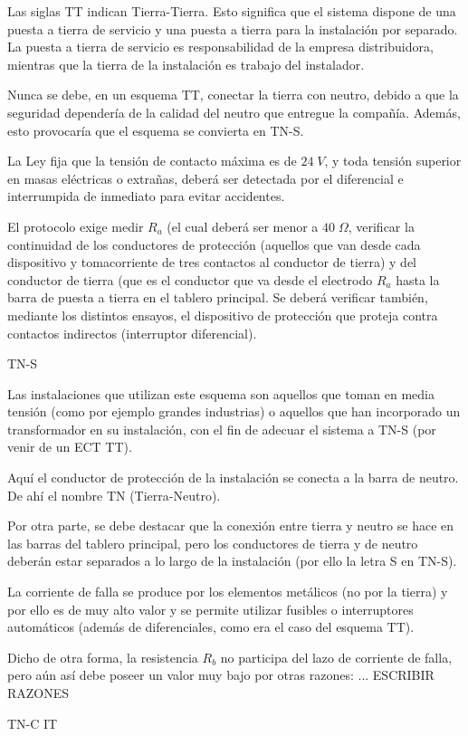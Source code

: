 Las siglas TT indican Tierra-Tierra. Esto significa que el sistema dispone de una puesta a tierra de servicio y una puesta a tierra para la instalación por separado. La puesta a tierra de servicio es responsabilidad de la empresa distribuidora, mientras que la tierra de la instalación es trabajo del instalador.

Nunca se debe, en un esquema TT, conectar la tierra con neutro, debido a que la seguridad dependería de la calidad del neutro que entregue la compañía. Además, esto provocaría que el esquema se convierta en TN-S.

La Ley fija que la tensión de contacto máxima es de $24\; V$, y toda tensión superior en masas eléctricas o extrañas, deberá ser detectada por el diferencial e interrumpida de inmediato para evitar accidentes.

El protocolo exige medir $R_a$ (el cual deberá ser menor a $40\; \Omega$, verificar la continuidad de los conductores de protección (aquellos que van desde cada dispositivo y tomacorriente de tres contactos al conductor de tierra) y del conductor de tierra (que es el conductor que va desde el electrodo $R_a$ hasta la barra de puesta a tierra en el tablero principal. Se deberá verificar también, mediante los distintos ensayos, el dispositivo de protección que proteja contra contactos indirectos (interruptor diferencial). 

TN-S

Las instalaciones que utilizan este esquema son aquellos que toman en media tensión (como por ejemplo grandes industrias) o aquellos que han incorporado un transformador en su instalación, con el fin de adecuar el sistema a TN-S (por venir de un ECT TT).

Aquí el conductor de protección de la instalación se conecta a la barra de neutro. De ahí el nombre TN (Tierra-Neutro).

Por otra parte, se debe destacar que la conexión entre tierra y neutro se hace en las barras del tablero principal, pero los conductores de tierra y de neutro deberán estar separados a lo largo de la instalación (por ello la letra S en TN-S).

La corriente de falla se produce por los elementos metálicos (no por la tierra) y por ello es de muy alto valor y se permite utilizar fusibles o interruptores automáticos (además de diferenciales, como era el caso del esquema TT).

Dicho de otra forma, la resistencia $R_b$ no participa del lazo de corriente de falla, pero aún así debe poseer un valor muy bajo por otras razones: ... ESCRIBIR RAZONES



TN-C
IT